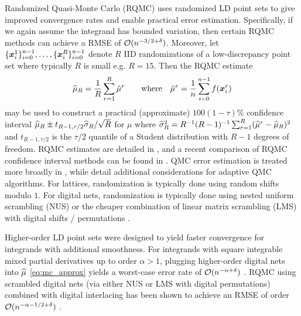 \documentclass[acmsmall]{acmart}
\begin{document}
Randomized Quasi-Monte Carlo (RQMC) uses randomized LD point sets to give improved convergence rates and enable practical error estimation. Specifically, if we again assume the integrand has bounded variation, then certain RQMC methods can achieve a RMSE of ${\mathcal{O}}(n^{-3/2+\delta})$. Moreover, let $\{{\boldsymbol{x}}_i^1\}_{i=0}^{n-1}, \dots, \{{\boldsymbol{x}}_i^R\}_{i=0}^{n-1}$ denote $R$ IID randomizations of a low-discrepancy point set where typically $R$ is small e.g. $R=15$. Then the RQMC estimate 
\begin{equation}
    {\widehat{\mu}}_R = \frac{1}{R} \sum_{r=1}^R \hat{\mu}^r \qquad \text{where} \quad \hat{\mu}^r = \frac{1}{n} \sum_{i=0}^{n-1} f({\boldsymbol{x}}_i^r)
    \label{eq:RQMC}
\end{equation}
may be used to construct a practical (approximate) $100(1-\tau)\%$ confidence interval ${\widehat{\mu}}_R \pm t_{R-1,\tau/2} {\widehat{\sigma}}_R/\sqrt{R}$ for $\mu$ where ${\widehat{\sigma}}_R^2 = R^{-1}(R-1)^{-1} \sum_{r=1}^R ({\widehat{\mu}}^r - {\widehat{\mu}}_R)^2$ and $t_{R-1,\tau/2}$ is the $\tau/2$ quantile of a Student distribution with $R-1$ degrees of freedom. RQMC estimates are detailed in \citep[Chapter 17]{owen.mc_book}, and a recent comparison of RQMC confidence interval methods can be found in \citep{l2023confidence}.  QMC error estimation is treated more broadly in \citep{owen2024error}, while \citep{clancy2014cost,adaptive_qmc} detail additional considerations for adaptive QMC algorithms. For lattices, randomization is typically done using random shifts modulo $1$. For digital nets, randomization is typically done using nested uniform scrambling (NUS) or the cheaper combination of linear matrix scrambling (LMS) with digital shifts / permutations \citep{MATOUSEK1998527,owen.variance_alternative_scrambles_digital_net,owen_halton,owen.gain_coefficients_scrambled_halton}.

Higher-order LD point sets were designed to yield faster convergence for integrands with additional smoothness. For integrands with square integrable mixed partial derivatives up to order $\alpha>1$, plugging higher-order digital nets into ${\widehat{\mu}}$ \eqref{eq:mc_approx} yields a worst-case error rate of ${\mathcal{O}}(n^{-\alpha+\delta})$ \citep{dick.walsh_spaces_HO_nets,dick.qmc_HO_convergence_MCQMC2008,dick.decay_walsh_coefficients_smooth_functions}. RQMC using scrambled digital nets (via either NUS or LMS with digital permutations) combined with digital interlacing has been shown to achieve an RMSE of order ${\mathcal{O}}(n^{-\alpha-1/2+\delta})$ \citep{dick.higher_order_scrambled_digital_nets}. %
\end{document}
